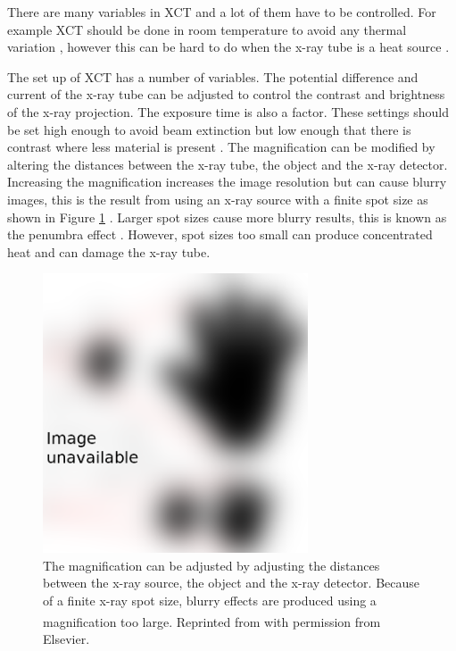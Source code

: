 There are many variables in XCT and a lot of them have to be controlled. For example XCT should be done in room temperature to avoid any thermal variation \citep{bryan1990international}, however this can be hard to do when the x-ray tube is a heat source \citep{kruth2011computed}.

The set up of XCT has a number of variables. The potential difference and current of the x-ray tube can be adjusted to control the contrast and brightness of the x-ray projection. The exposure time is also a factor. These settings should be set high enough to avoid beam extinction but low enough that there is contrast where less material is present \citep{kruth2011computed}. The magnification can be modified by altering the distances between the x-ray tube, the object and the x-ray detector. Increasing the magnification increases the image resolution but can cause blurry images, this is the result from using an x-ray source with a finite spot size as shown in Figure \ref{fig:literature_magnification} \citep{kruth2011computed}. Larger spot sizes cause more blurry results, this is known as the penumbra effect \citep{kueh2016modelling}. However, spot sizes too small can produce concentrated heat \citep{welkenhuyzen2009industrial} and can damage the x-ray tube.

\begin{figure}
  \centering
  \includegraphics[width=0.7\textwidth]{../figures/literatureReview/literature_magnification.png}
  \caption{The magnification can be adjusted by adjusting the distances between the x-ray source, the object and the x-ray detector. Because of a finite x-ray spot size, blurry effects are produced using a magnification too large. Reprinted from \cite{kruth2011computed}\textsuperscript{\textcopyright} with permission from Elsevier.}
  \label{fig:literature_magnification}
\end{figure}

